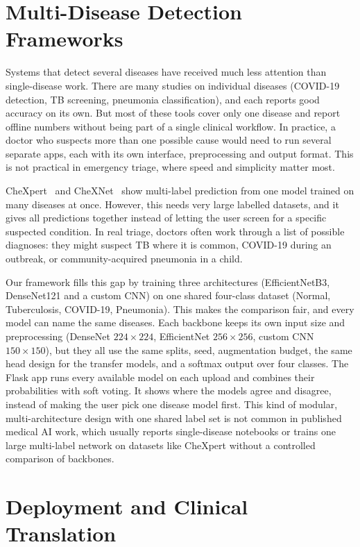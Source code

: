 \section{Multi-Disease Detection Frameworks}

Systems that detect several diseases have received much less attention than single-disease work. There are many studies on individual diseases (COVID-19 detection, TB screening, pneumonia classification), and each reports good accuracy on its own. But most of these tools cover only one disease and report offline numbers without being part of a single clinical workflow. In practice, a doctor who suspects more than one possible cause would need to run several separate apps, each with its own interface, preprocessing and output format. This is not practical in emergency triage, where speed and simplicity matter most.

CheXpert~\cite{irvin2019} and CheXNet~\cite{rajpurkar2017} show multi-label prediction from one model trained on many diseases at once. However, this needs very large labelled datasets, and it gives all predictions together instead of letting the user screen for a specific suspected condition. In real triage, doctors often work through a list of possible diagnoses: they might suspect TB where it is common, COVID-19 during an outbreak, or community-acquired pneumonia in a child.

Our framework fills this gap by training three architectures (EfficientNetB3, DenseNet121 and a custom CNN) on one shared four-class dataset (Normal, Tuberculosis, COVID-19, Pneumonia). This makes the comparison fair, and every model can name the same diseases. Each backbone keeps its own input size and preprocessing (DenseNet $224\times224$, EfficientNet $256\times256$, custom CNN $150\times150$), but they all use the same splits, seed, augmentation budget, the same head design for the transfer models, and a softmax output over four classes. The Flask app runs every available model on each upload and combines their probabilities with soft voting. It shows where the models agree and disagree, instead of making the user pick one disease model first. This kind of modular, multi-architecture design with one shared label set is not common in published medical AI work, which usually reports single-disease notebooks or trains one large multi-label network on datasets like CheXpert without a controlled comparison of backbones.

\section{Deployment and Clinical Translation}

